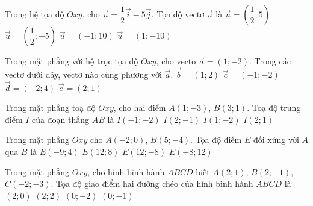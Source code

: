 \begin{ex}%
Trong hệ tọa độ $Oxy$, cho $\vec{u}=\dfrac{1}{2} \vec{i}-5 \vec{j}$. Tọa độ vectơ $\vec{u}$ là
\choice
{$\vec{u}=\left(\dfrac{1}{2} ; 5\right)$}
{\True $\vec{u}=\left(\dfrac{1}{2} ;-5\right)$}
{$\vec{u}=(-1 ; 10)$}
{$\vec{u}=(1 ;-10)$}
\end{ex}

\begin{ex}%
Trong mặt phẳng với hệ trục tọa độ $Oxy$, cho vecto $\vec{a}=(1 ;-2)$. Trong các vectơ dưới đây, vectơ nào cùng phương với $\vec{a}$.
\choice
{$\vec{b}=(1 ; 2)$}
{$\vec{c}=(-1 ;-2)$}
{\True $\vec{d}=(-2 ; 4)$}
{$\vec{e}=(2 ; 1)$}
\end{ex}

\begin{ex}%
Trong mặt phẳng toạ độ $Oxy$, cho hai điểm $A(1 ;-3)$, $B(3 ; 1)$. Toạ độ trung điểm $I$ của đoạn thẳng $AB$ là
\choice
{$I(-1 ;-2)$}
{\True $I(2 ;-1)$}
{$I(1 ;-2)$}
{$I(2 ; 1)$}
\end{ex}

\begin{ex}%
Trong mặt phẳng $Oxy$ cho $A(-2 ; 0)$, $B(5 ;-4)$. Tọa độ điểm $E$ đối xứng với $A$ qua $B$ là
\choice
{$E(-9 ; 4)$}
{$E(12 ; 8)$}
{\True $E(12 ;-8)$}
{$E(-8 ; 12)$}
\end{ex}

\begin{ex}%
Trong mặt phẳng $Oxy$, cho hình bình hành $ABCD$ biết $A(2 ; 1)$, $B(2 ;-1)$, $C(-2 ;-3)$. Tọa độ giao điểm hai đường chéo của hình bình hành $ABCD$ là
\choice
{$(2 ; 0)$}
{$(2 ; 2)$}
{$(0 ;-2)$}
{\True $(0 ;-1)$}
\end{ex}

